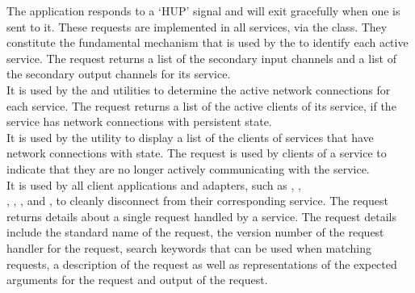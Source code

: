 The  application responds to a `HUP'
signal and will exit gracefully when one is sent to it.
\secondaryEnd{}
These requests are implemented in all \mplusm{} services, via the
 class.
They constitute the fundamental mechanism that is used by the
 to identify each active service.
The  request returns a list of the secondary input
channels and a list of the secondary output channels for its service.\\

It is used by the  and
 utilities to determine the active \yarp{}
network connections for each service.
The  request returns a list of the active clients of
its service, if the service has \yarp{} network connections with persistent state.\\

It is used by the  utility to display a list of the clients
of services that have \yarp{} network connections with state.
The  request is used by clients of a service to
indicate that they are no longer actively communicating with the service.\\

It is used by all client applications and adapters, such as
,
,\\
, ,
,
 and
, to cleanly disconnect from their
corresponding service.
The  request returns details about a single request
handled by a service.
The request details include the standard name of the request, the version number of the
request handler for the request, search keywords that can be used when matching requests,
a description of the request as well as representations of the expected arguments for the
request and output of the request.\\


